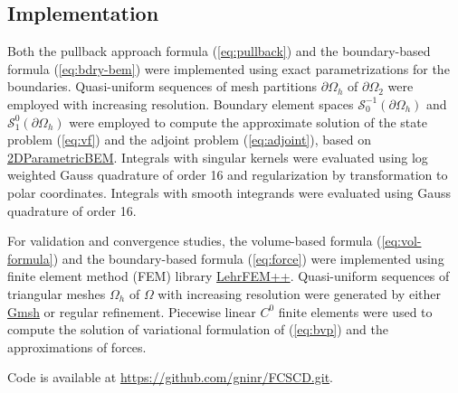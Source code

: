 \documentclass{article}
\theoremstyle{remark}
\begin{document}
\subsection{Implementation}
Both the pullback approach formula (\ref{eq:pullback}) and the boundary-based formula (\ref{eq:bdry-bem}) were implemented using exact parametrizations for the boundaries. Quasi-uniform sequences of mesh partitions $\partial\Omega_h$ of $\partial\Omega_2$ were employed with increasing resolution. Boundary element spaces $\mathcal{S}_0^{-1}(\partial\Omega_h)$ and $\mathcal{S}_1^{0}(\partial\Omega_h)$ were employed to compute the approximate solution of the state problem (\ref{eq:vf}) and the adjoint problem (\ref{eq:adjoint}), based on \href{https://gitlab.ethz.ch/ppanchal/2dparametricbem.git}{2DParametricBEM}. Integrals with singular kernels were evaluated using log weighted Gauss quadrature of order 16 and regularization by transformation to polar coordinates. Integrals with smooth integrands were evaluated using Gauss quadrature of order 16.

For validation and convergence studies, the volume-based formula (\ref{eq:vol-formula}) and the boundary-based formula (\ref{eq:force}) were implemented using finite element method (FEM) library \href{https://craffael.github.io/lehrfempp/index.html}{LehrFEM++}. Quasi-uniform sequences of triangular meshes $\Omega_h$ of $\Omega$ with increasing resolution were generated by either \href{https://gmsh.info/}{Gmsh} or regular refinement. Piecewise linear $C^0$ finite elements were used to compute the solution of variational formulation of (\ref{eq:bvp}) and the approximations of forces.

Code is available at \url{https://github.com/gninr/FCSCD.git}.
\end{document}
